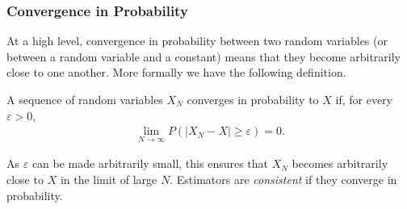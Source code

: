 %
%

\subsubsection{Convergence in Probability}
\label{sec:inf:mc:conv:prob}

At a high level, convergence in probability between two random variables (or between a random variable and
a constant) means that they become arbitrarily close to one another.  More
formally we have the following definition.
\begin{definition}
A sequence of random variables $X_N$ converges in probability to $X$ if, for every $\varepsilon>0$,
\begin{align}
\lim\limits_{N\rightarrow\infty} P(\left|X_N-X\right|\ge\varepsilon)=0.
\end{align}
\end{definition}
\noindent As $\varepsilon$ can be made arbitrarily small, this ensures that $X_N$ becomes arbitrarily
close to $X$ in the limit of large $N$.  Estimators are \emph{consistent} if they converge
in probability.

